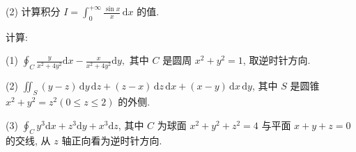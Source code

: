 (2) 计算积分 $I = \int_{0}^{+\infty} \frac{\sin x}{x} \, \mathrm{d}x$ 的值.\par
计算:\par
(1) $\oint_{C} \frac{y}{x^{2} + 4y^{2}} \mathrm{d}x - \frac{x}{x^{2} + 4y^{2}} \mathrm{d}y,$ 其中 $C$ 是圆周 $x^{2} + y^{2} = 1$, 取逆时针方向.\par
(2) $\iint_{S} (y - z) \, \mathrm{d}y \, \mathrm{d}z + (z - x) \, \mathrm{d}z \, \mathrm{d}x + (x - y) \, \mathrm{d}x \, \mathrm{d}y$, 其中 $S$ 是圆锥 $x^2 + y^2 = z^2 (0 \leq z \leq 2)$ 的外侧.\par
(3) $\oint_{C} y^{3} \mathrm{d}x + z^{3} \mathrm{d}y + x^{3} \mathrm{d}z$, 其中 $C$ 为球面 $x^{2} + y^{2} + z^{2} = 4$ 与平面 $x + y + z = 0$ 的交线, 从 $z$ 轴正向看为逆时针方向.\par
